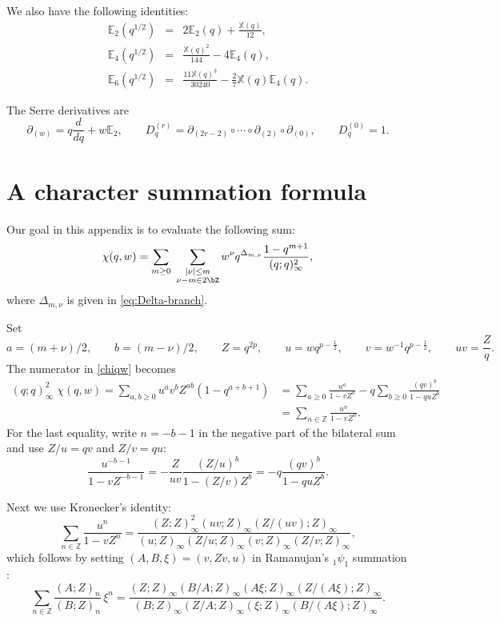 \documentclass[a4paper,11pt]{article}
\theoremstyle{definition}
\theoremstyle{definition}
\theoremstyle{remark}
\newcommand{\be}{\begin{equation}}
\newcommand{\ee}{\end{equation}}
\newcommand{\beqn}{\begin{eqnarray}}
\newcommand{\eeqn}{\end{eqnarray}}
\begin{document}
We also have the following identities: 
\beqn\label{e246res}
\mathbb{E}_2(q^{1/2})&=&2\mathbb{E}_2(q)+\frac{\mathbb{X}(q)}{12},\\
\mathbb{E}_4(q^{1/2})&=&\frac{\mathbb{X}(q)^2}{144}-4\mathbb{E}_4(q), \label{e246res1}\\
\mathbb{E}_6(q^{1/2})&=&\frac{11\mathbb{X}(q)^3}{30240}
-\frac27\mathbb{X}(q)\mathbb{E}_4(q).\label{e246res2}
\eeqn

The Serre derivatives are 
\be\label{serdfdsf}
\partial_{(w)}=q\frac{d}{dq}+w\mathbb{E}_2,
\qquad D_q^{(r)}=\partial_{(2r-2)}\circ\cdots\circ\partial_{(2)}\circ\partial_{(0)},
\qquad D_q^{(0)}=1.
\ee
 

 
\section{A character  summation formula     }\label{idfsfdsdf}

Our goal in this appendix is to evaluate the following sum:
 \be\label{chiqw}
\chi(q,w)= \sum_{m\geq0}\ \sum_{\substack{|\nu|\leq m\\\nu - m\in 2\bZ }}w^\nu q^{\Delta_{m,\nu}}
\frac{1-q^{m+1}}{(q;q)_\infty^2}  ,
 \ee
 where $\Delta_{m,\nu}$ is given in \eqref{eq:Delta-branch}. 
 
Set
\be
a=(m+ \nu)/2 ,\qquad b=(m-\nu)/2, \qquad
Z=q^{2p},\qquad
u=wq^{p-\frac12},\qquad
v=w^{-1}q^{p-\frac12},
\qquad uv=\frac{Z}{q}.
\ee
The numerator in \eqref{chiqw} becomes
\begin{align}
 (q;q)_\infty^2 \; \chi(q,w)
 =\sum_{a,b\geq0}u^a v^b Z^{ab}(1-q^{a+b+1})
& =\sum_{a\geq0}\frac{u^a}{1-vZ^a}
  -q\sum_{b\geq0}\frac{(qv)^b}{1-quZ^b}
\nonumber\\
&=\sum_{n\in\mathbb Z}\frac{u^n}{1-vZ^n}.
\label{chifsf2}
\end{align}
For the last equality, write $n=-b-1$ in the negative part
of the bilateral sum and use $Z/u=qv$ and $Z/v=qu$:
\be
\frac{u^{-b-1}}{1-vZ^{-b-1}}
=-\frac{Z}{uv}\frac{(Z/u)^b}{1-(Z/v)Z^b}
=-q\frac{(qv)^b}{1-quZ^b}.
\ee
 
Next we   use   Kronecker's identity:
\begin{equation}\label{kronide}
\sum_{n\in\mathbb Z}\frac{u^n}{1-vZ^n}
=
\frac{(Z;Z)_\infty^2(uv;Z)_\infty(Z/(uv);Z)_\infty}
 {(u;Z)_\infty(Z/u;Z)_\infty
  (v;Z)_\infty(Z/v;Z)_\infty},
\end{equation}
which follows by setting $(A,B,\xi)=(v,Zv,u)$ in Ramanujan's ${}_1\psi_1$ summation
\cite{warnaar2012ramanujans1psi1summation}:
\begin{equation}
\sum_{n\in\mathbb Z}\frac{(A;Z)_n}{(B;Z)_n}\,\xi^n
=
\frac{
 (Z;Z)_\infty(B/A;Z)_\infty
 (A\xi;Z)_\infty(Z/(A\xi);Z)_\infty
}{
 (B;Z)_\infty(Z/A;Z)_\infty
 (\xi;Z)_\infty(B/(A\xi);Z)_\infty
}.
\end{equation}
\end{document}
